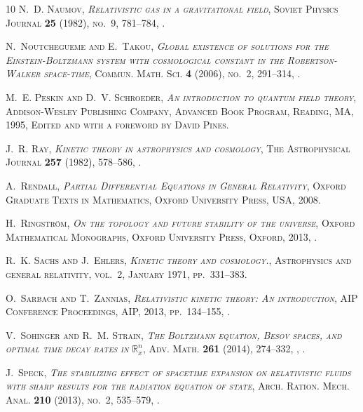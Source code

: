 \documentclass[reqno]{amsart}
\theoremstyle{definition}
\numberwithin{equation}{section}
\numberwithin{theorem}{section}
\begin{document}
\begin{thebibliography}{10}
\bgroup\scshape{}N.~D. Naumov\egroup{}, \emph{Relativistic gas in a gravitational field}, Soviet Physics Journal \textbf{25} (1982), no.~9, 781--784, .

\bgroup\scshape{}N.~Noutchegueme\egroup{} and \bgroup\scshape{}E.~Takou\egroup{}, \emph{Global existence of solutions for the {E}instein-{B}oltzmann system with cosmological constant in the {R}obertson-{W}alker space-time}, Commun. Math. Sci. \textbf{4} (2006), no.~2, 291--314, .

\bgroup\scshape{}M.~E. Peskin\egroup{} and \bgroup\scshape{}D.~V. Schroeder\egroup{}, \emph{An introduction to quantum field theory}, Addison-Wesley Publishing Company, Advanced Book Program, Reading, MA, 1995, Edited and with a foreword by David Pines.

\bgroup\scshape{}J.~R. Ray\egroup{}, \emph{Kinetic theory in astrophysics and cosmology}, The Astrophysical Journal \textbf{257} (1982), 578--586, .

\bgroup\scshape{}A.~Rendall\egroup{}, \emph{{P}artial {D}ifferential {E}quations in {G}eneral {R}elativity}, Oxford Graduate Texts in Mathematics, Oxford University Press, USA, 2008.

\bgroup\scshape{}H.~Ringstr\"{o}m\egroup{}, \emph{On the topology and future stability of the universe}, Oxford Mathematical Monographs, Oxford University Press, Oxford, 2013, .

\bgroup\scshape{}R.~K. {Sachs}\egroup{} and \bgroup\scshape{}J.~{Ehlers}\egroup{}, \emph{{Kinetic theory and cosmology.}}, Astrophysics and general relativity, vol.~2, January 1971, pp.~331--383.

\bgroup\scshape{}O.~Sarbach\egroup{} and \bgroup\scshape{}T.~Zannias\egroup{}, \emph{Relativistic kinetic theory: An introduction}, AIP Conference Proceedings, AIP, 2013, pp.~134--155, .

\bgroup\scshape{}V.~Sohinger\egroup{} and \bgroup\scshape{}R.~M. Strain\egroup{}, \emph{The {B}oltzmann equation, {B}esov spaces, and optimal time decay rates in {$\mathbb{R}_x^n$}}, Adv. Math. \textbf{261} (2014), 274--332, , .

\bgroup\scshape{}J.~Speck\egroup{}, \emph{The stabilizing effect of spacetime expansion on relativistic fluids with sharp results for the radiation equation of state}, Arch. Ration. Mech. Anal. \textbf{210} (2013), no.~2, 535--579, .


\end{thebibliography}
\end{document}
